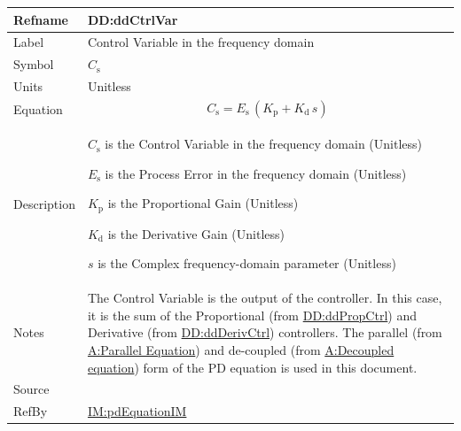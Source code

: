 \documentclass[12pt]{article}
\begin{document}
\medskip
\noindent
\begin{minipage}{\textwidth}
\begin{tabular}{>{\raggedright}p{}>{\raggedright\arraybackslash}p{}}
\toprule \textbf{Refname} & \textbf{DD:ddCtrlVar}
\label{DD:ddCtrlVar}
\\ \midrule
Label & Control Variable in the frequency domain
        
\\ \midrule
Symbol & ${C_{\text{s}}}$
         
\\ \midrule
Units & Unitless
        
\\ \midrule
Equation & \begin{displaymath}
           {C_{\text{s}}}={E_{\text{s}}}\,\left({K_{\text{p}}}+{K_{\text{d}}}\,s\right)
           \end{displaymath}
\\ \midrule
Description & \begin{symbDescription}
              \item{${C_{\text{s}}}$ is the Control Variable in the frequency domain (Unitless)}
              \item{${E_{\text{s}}}$ is the Process Error in the frequency domain (Unitless)}
              \item{${K_{\text{p}}}$ is the Proportional Gain (Unitless)}
              \item{${K_{\text{d}}}$ is the Derivative Gain (Unitless)}
              \item{$s$ is the Complex frequency-domain parameter (Unitless)}
              \end{symbDescription}
\\ \midrule
Notes & The Control Variable is the output of the controller. In this case, it is the sum of the Proportional (from \hyperref[DD:ddPropCtrl]{DD:ddPropCtrl}) and Derivative (from \hyperref[DD:ddDerivCtrl]{DD:ddDerivCtrl}) controllers. The parallel (from \hyperref[parallelEq]{A:Parallel Equation}) and de-coupled (from \hyperref[decoupled]{A:Decoupled equation}) form of the PD equation is used in this document.
        
\\ \midrule
Source & \cite{johnson2008}
         
\\ \midrule
RefBy & \hyperref[IM:pdEquationIM]{IM:pdEquationIM}
        
\\ \bottomrule
\end{tabular}
\end{minipage}
\end{document}
